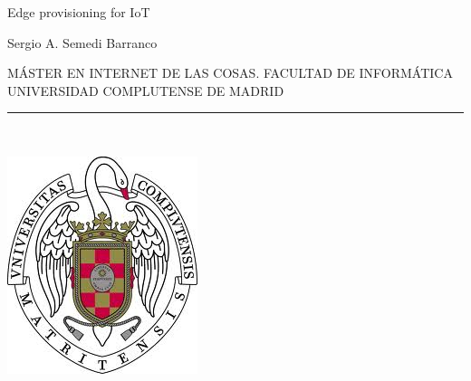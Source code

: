 \newpage


\thispagestyle{empty}


\begin{center}

   \vspace{1cm}


   {\Large Edge provisioning for IoT}\\

   \vspace{0.5cm}



   \vspace{0.5cm}



   {\large Sergio A. Semedi Barranco}\\

   \vspace{0.5cm}




   MÁSTER EN INTERNET DE LAS COSAS. FACULTAD DE INFORMÁTICA\\
   UNIVERSIDAD COMPLUTENSE DE MADRID \\


   \vspace{0.65cm}
   \rule{2in}{0.5pt}\\
   \vspace{0.85cm}

  \includegraphics[height=2.5in]{figures/escudo.jpg}
  


\end{center}
